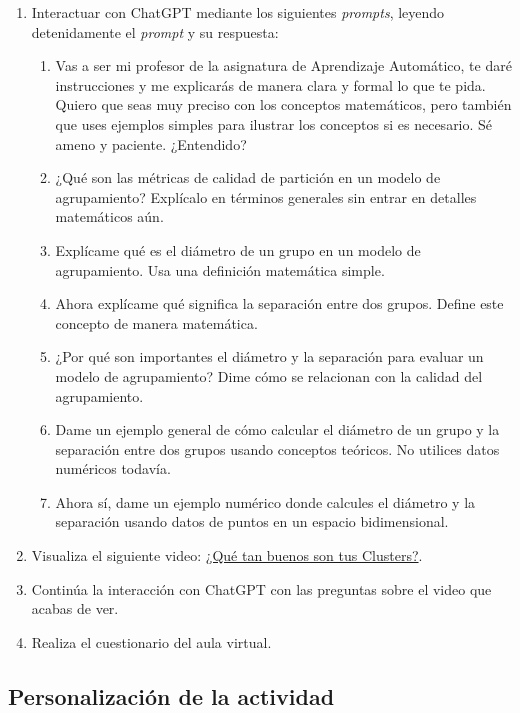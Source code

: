 \documentclass[a4,11pt]{aleph-notas}
\begin{document}
\begin{enumerate}[leftmargin=*]
    \item Interactuar con ChatGPT mediante los siguientes \textit{prompts}, leyendo detenidamente el \textit{prompt} y su respuesta:
    \begin{enumerate}[label=\textit{Prompt \arabic*.},leftmargin=2.1cm]
        \item Vas a ser mi profesor de la asignatura de Aprendizaje Automático, te daré instrucciones y me explicarás de manera clara y formal lo que te pida. Quiero que seas muy preciso con los conceptos matemáticos, pero también que uses ejemplos simples para ilustrar los conceptos si es necesario. Sé ameno y paciente. ¿Entendido?
        \item ¿Qué son las métricas de calidad de partición en un modelo de agrupamiento? Explícalo en términos generales sin entrar en detalles matemáticos aún.
        \item Explícame qué es el diámetro de un grupo en un modelo de agrupamiento. Usa una definición matemática simple.
        \item Ahora explícame qué significa la separación entre dos grupos. Define este concepto de manera matemática.
        \item ¿Por qué son importantes el diámetro y la separación para evaluar un modelo de agrupamiento? Dime cómo se relacionan con la calidad del agrupamiento.
        \item Dame un ejemplo general de cómo calcular el diámetro de un grupo y la separación entre dos grupos usando conceptos teóricos. No utilices datos numéricos todavía.
        \item Ahora sí, dame un ejemplo numérico donde calcules el diámetro y la separación usando datos de puntos en un espacio bidimensional.
    \end{enumerate}
    \item Visualiza el siguiente video: \href{https://youtu.be/b920s9nXGao?si=es5xjKYBKtfcdeTM}{¿Qué tan buenos son tus Clusters?}.
    \item Continúa la interacción con ChatGPT con las preguntas sobre el video que acabas de ver.
    \item Realiza el cuestionario del aula virtual.
\end{enumerate}

\subsection{Personalización de la actividad}
\end{document}
